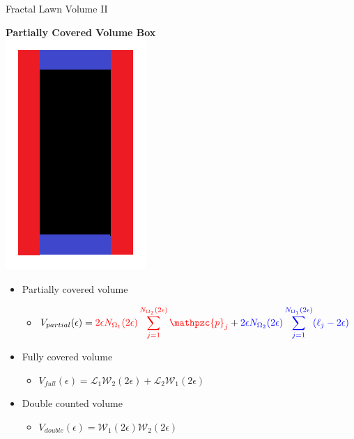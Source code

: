 \documentclass{beamer}
\newcommand{\SL}{\mathcal{L}}
\newcommand{\Om}{\Omega}
\newcommand{\W}{\mathcal{W}}
\newcommand{\p}{\mathpzc{p}}
\begin{document}
\begin{frame}{Fractal Lawn Volume II}
	\begin{center}
		{\bf Partially Covered Volume Box} \\
		\includegraphics[scale=0.25]{VolumeBox.png}
	\end{center}
	\pause
	\vspace{0.2in}
	
	\begin{itemize}
		\item Partially covered volume
		\begin{itemize}
			\item $\displaystyle V_{partial}(\epsilon)=\textcolor{red}{2\epsilon N_{\Om_1}(2\epsilon)\sum_{j=1}^{N_{\Om_2}(2\epsilon)} \p_j} + \textcolor{blue}{2\epsilon N_{\Om_2}(2\epsilon)\sum_{j=1}^{N_{\Om_1}(2\epsilon)} (\ell_j - 2\epsilon)}$
		\end{itemize}
		\pause
		
		\item Fully covered volume
		\begin{itemize}
			\item $\displaystyle V_{full}(\epsilon)=\SL_1 \W_2(2\epsilon) + \SL_2 \W_1(2\epsilon)$
		\end{itemize}
		\pause
		
		\item Double counted volume
		\begin{itemize}
			\item $V_{double}(\epsilon)=\W_1(2\epsilon) \W_2(2\epsilon)$
		\end{itemize}
	\end{itemize}
	
\end{frame}
\end{document}

